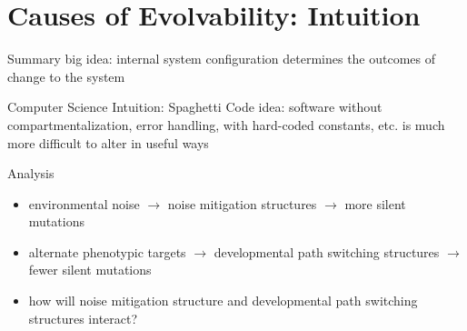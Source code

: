 \section{Causes of Evolvability: Intuition}

\begin{frame}{Summary}
  \alert{big idea}: internal system configuration determines the outcomes of change to the system
\end{frame}


\begin{frame}{Computer Science Intuition: Spaghetti Code}
  idea: software without compartmentalization, error handling, with hard-coded constants, etc. is much more difficult to alter in useful ways
  
\end{frame}

\begin{frame}{Analysis}
\begin{itemize}
	\item environmental noise $\rightarrow$ noise mitigation structures $\rightarrow$ more silent mutations
    \item alternate phenotypic targets $\rightarrow$ developmental path switching structures $\rightarrow$ fewer silent mutations
    \item how will noise mitigation structure and developmental path switching structures interact?
 \end{itemize}
\end{frame}
